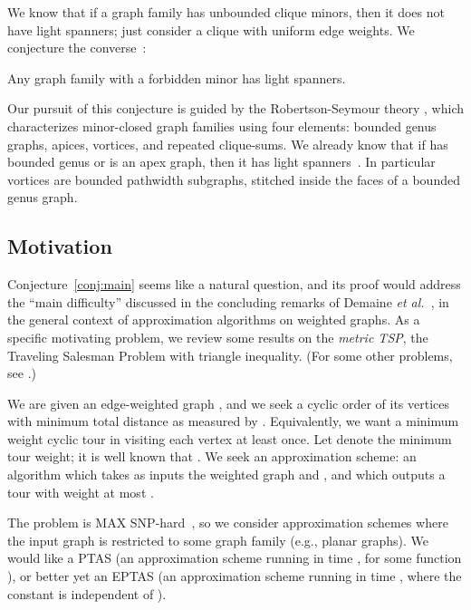 \documentclass{llncs}
\begin{document}
We know that if a graph family has unbounded clique minors, then it
does not have light spanners; just consider a clique with uniform edge
weights.  We conjecture the
converse~\cite{Grigni:2000:ATG:646253.686316}:
\begin{conjecture}\label{conj:main}
Any graph family with a forbidden minor has light spanners.
\end{conjecture}

Our pursuit of this conjecture is guided by the Robertson-Seymour
theory \cite{DBLP:journals/jct/RobertsonS03a}, which characterizes 
minor-closed graph families using four elements: bounded genus graphs,
apices, vortices, and repeated clique-sums.  We already know that if
 has bounded genus or is an apex graph, then it has light
spanners~\cite
{Grigni:2000:ATG:646253.686316,Grigni:2002:LSA:545381.545492}.
In particular vortices are bounded pathwidth subgraphs, stitched inside
the faces of a bounded genus graph.


\subsection{Motivation}

Conjecture~\ref{conj:main} seems like a natural question, and its
proof would address the ``main difficulty'' discussed in the
concluding remarks of Demaine \emph{et
al.}~\cite{Demaine:2007:AAV:1283383.1283413}, in the general context
of approximation algorithms on weighted graphs.  As a specific
motivating problem, we review some results on the \emph{metric TSP},
the Traveling Salesman Problem with triangle inequality.  (For some
other problems, see
\cite{Berger05approximationschemes,DBLP:conf/icalp/BergerG07}.)

 We are given an edge-weighted graph , and we seek a cyclic
order of its vertices with minimum total distance as measured by
.  Equivalently, we want a minimum weight cyclic tour in 
visiting each vertex at least once.  Let  denote the minimum
tour weight; it is well known that .  We seek an approximation scheme: an algorithm which
takes as inputs the weighted graph  and , and which
outputs a tour with weight at most .

The problem is MAX SNP-hard~\cite{PY-tsp12-93}, so we consider
approximation schemes where the input graph  is restricted to some
graph family  (e.g., planar graphs).  We would like a
PTAS (an approximation scheme running in time ,
for some function ), or better yet an EPTAS (an approximation
scheme running in time , where the constant
 is independent of ).
\end{document}
